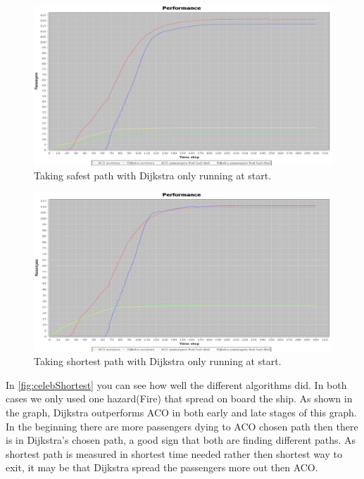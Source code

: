 \begin{figure} [h]
\centering
\hspace*{-1.0in}
\includegraphics[scale=0.35]{images/Graph-using-1000-rounds-140-passangers-safestpath-and-one-fire-dijkstra-one-time.png}
\caption{Taking safest path with Dijkstra only running at start.}
\label{fig:celebSafestDF}
\end{figure}

\begin{figure} [h]
\centering
\hspace*{-1.0in}
\includegraphics[scale=0.35]{images/Graph-using-1000-rounds-140-passangers-shortestpath-and-one-fire-dijkstra-one-time.png}
\caption{Taking shortest path with Dijkstra only running at start.}
\label{fig:celebShortestDF}
\end{figure}


In \ref{fig:celebShortest} you can see how well the different algorithms did. In both cases we only used one hazard(Fire) that spread on board the ship. As shown in the graph, Dijkstra outperforms ACO in both early and late stages of this graph. In the beginning there are more passengers dying to ACO chosen path then there is in Dijkstra's chosen path, a good sign that both are finding different paths. As shortest path is measured in shortest time needed rather then shortest way to exit, it may be that Dijkstra spread the passengers more out then ACO.

